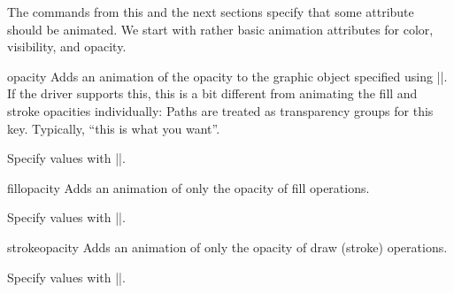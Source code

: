 The commands from this and the next sections specify that some attribute should
be animated. We start with rather basic animation attributes for color,
visibility, and opacity.

\begin{sysanimateattribute}{opacity}
    Adds an animation of the opacity to the graphic object specified using
    |\pgfsysanimkeywhom|. If the driver supports this, this is a bit different
    from animating the fill and stroke opacities individually: Paths are
    treated as transparency groups for this key. Typically, ``this is what you
    want''.

    Specify values with |\pgfsysanimvalscalar|.
\begin{codeexample}[imagesource={standalone/pgfmanual-en-pgfsys-animations-animation-3.svg}]
\end{codeexample}
\end{sysanimateattribute}

\begin{sysanimateattribute}{fillopacity}
    Adds an animation of only the opacity of fill operations.

    Specify values with |\pgfsysanimvalscalar|.
\begin{codeexample}[imagesource={standalone/pgfmanual-en-pgfsys-animations-animation-4.svg}]
\end{codeexample}
\end{sysanimateattribute}

\begin{sysanimateattribute}{strokeopacity}
    Adds an animation of only the opacity of draw (stroke) operations.

    Specify values with |\pgfsysanimvalscalar|.
\begin{codeexample}[imagesource={standalone/pgfmanual-en-pgfsys-animations-animation-5.svg}]
\end{codeexample}
\end{sysanimateattribute}

